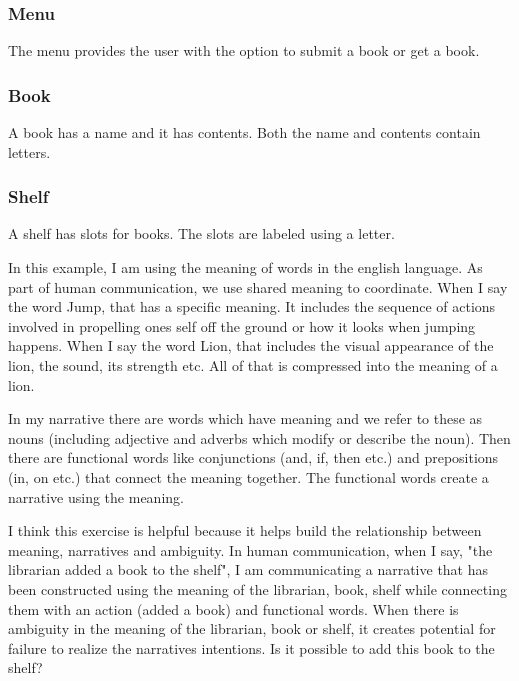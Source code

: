 \subsubsection*{Menu}
\begin{greyquote}
    The menu provides the user with the option to submit a book or get a book.
\end{greyquote}

\subsubsection*{Book}
\begin{greyquote}
    A book has a name and it has contents. Both the name and contents contain letters.
\end{greyquote}

\subsubsection*{Shelf}
\begin{greyquote}
    A shelf has slots for books. The slots are labeled using a letter.
\end{greyquote}

In this example, I am using the meaning of words in the english language. As part of human communication, we use shared meaning to coordinate. When I say the word Jump, that has a specific meaning. It includes the sequence of actions involved in propelling ones self off the ground or how it looks when jumping happens. When I say the word Lion, that includes the visual appearance of the lion, the sound, its strength etc. All of that is compressed into the meaning of a lion.

In my narrative there are words which have meaning and we refer to these as nouns (including adjective and adverbs which modify or describe the noun). Then there are functional words like conjunctions (and, if, then etc.) and prepositions (in, on etc.) that connect the meaning together. The functional words create a narrative using the meaning. 

I think this exercise is helpful because it helps build the relationship between meaning, narratives and ambiguity. In human communication, when I say, "the librarian added a book to the shelf", I am communicating a narrative that has been constructed using the meaning of the librarian, book, shelf while connecting them with an action (added a book) and functional words. When there is ambiguity in the meaning of the librarian, book or shelf, it creates potential for failure to realize the narratives intentions. Is it possible to add this book to the shelf? 

